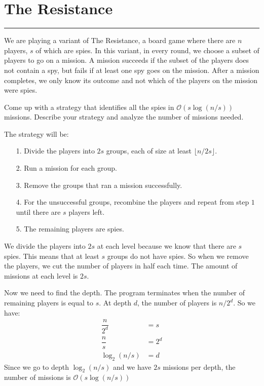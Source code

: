 \documentclass{article}
\begin{document}
\newpage
\section*{The Resistance}
\hrule

We are playing a variant of The Resistance, a board game where there are $n$ players, $s$ of which are spies. In this variant, in every round, we choose a subset of players to go on a mission. A mission succeeds if the subset of the players does not contain a spy, but fails if at least one spy goes on the mission. After a mission completes, we only know its outcome and not which of the players on the mission were spies.

Come up with a strategy that identifies all the spies in $\mathcal{O}(s\log(n / s))$ missions. Describe your strategy and analyze the number of missions needed.
    \begin{answer}
        The strategy will be:
            \begin{itemize}
                \item [1.] Divide the players into $2s$ groups, each of size at least $\lfloor n / 2s \rfloor$.

                \item [2.] Run a mission for each group.

                \item [3.] Remove the groups that ran a mission successfully.

                \item [4.] For the unsuccessful groups, recombine the players and repeat from step $1$ until there are $s$ players left.

                \item [5.] The remaining players are spies.
            \end{itemize}
        We divide the players into $2s$ at each level because we know that there are $s$ spies. This means that at least $s$ groups do not have spies. So when we remove the players, we cut the number of players in half each time. The amount of missions at each level is $2s$. 

        Now we need to find the depth. The program terminates when the number of remaining players is equal to $s$. At depth $d$, the number of players is $n / 2^{d}$. So we have:
            \begin{align*}
                \dfrac{n}{2^{d}} &= s \\
                \dfrac{n}{s} &= 2^{d} \\
                \log_{2}(n / s) &= d
            \end{align*}
        Since we go to depth $\log_{2}(n / s)$ and we have $2s$ missions per depth, the number of missions is $\mathcal{O}(s\log(n / s))$
    \end{answer}
\end{document}
